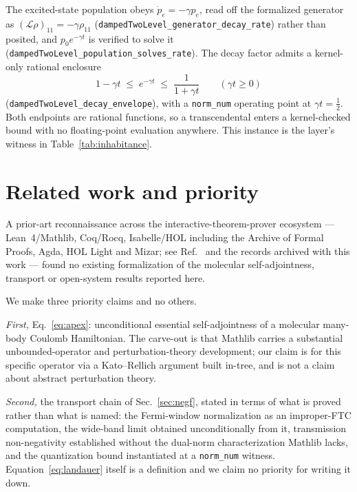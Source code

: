 \documentclass[aps,prd,reprint,nofootinbib,superscriptaddress]{revtex4-2}
\newcommand{\thm}[1]{\texttt{#1}}   %
\newcommand{\Lean}{Lean~4}
\begin{document}
The excited-state population obeys $\dot p_{e}=-\gamma p_{e}$, read off the formalized generator as
$(\mathcal{L}\rho)_{11}=-\gamma\rho_{11}$ (\thm{dampedTwoLevel\_generator\_decay\_rate}) rather than
posited, and $p_{0}e^{-\gamma t}$ is verified to solve it
(\thm{dampedTwoLevel\_population\_solves\_rate}). The decay factor admits a kernel-only rational
enclosure
\begin{equation}
1-\gamma t \;\le\; e^{-\gamma t} \;\le\; \frac{1}{1+\gamma t}
\qquad (\gamma t\ge0)
\label{eq:decay-envelope}
\end{equation}
(\thm{dampedTwoLevel\_decay\_envelope}), with a \texttt{norm\_num} operating point at
$\gamma t=\tfrac12$. Both endpoints are rational functions, so a transcendental enters a
kernel-checked bound with no floating-point evaluation anywhere. This instance is the layer's witness
in Table~\ref{tab:inhabitance}.

\section{Related work and priority}
\label{sec:related}

A prior-art reconnaissance across the interactive-theorem-prover ecosystem --- \Lean{}/Mathlib,
Coq/Rocq, Isabelle/HOL including the Archive of Formal Proofs, Agda, HOL Light and Mizar; see
Ref.~\cite{survey2021} and the records archived with this work --- found no existing formalization of
the molecular self-adjointness, transport or open-system results reported here.

We make three priority claims and no others.

\emph{First,} Eq.~\eqref{eq:apex}: unconditional essential self-adjointness of a molecular many-body
Coulomb Hamiltonian. The carve-out is that Mathlib carries a substantial unbounded-operator and
perturbation-theory development; our claim is for this specific operator via a Kato--Rellich argument
built in-tree, and is not a claim about abstract perturbation theory.

\emph{Second,} the transport chain of Sec.~\ref{sec:negf}, stated in terms of what is proved rather
than what is named: the Fermi-window normalization as an improper-FTC computation, the wide-band
limit obtained unconditionally from it, transmission non-negativity established without the dual-norm
characterization Mathlib lacks, and the quantization bound instantiated at a \texttt{norm\_num}
witness. Equation~\eqref{eq:landauer} itself is a definition and we claim no priority for writing it
down.
\end{document}

